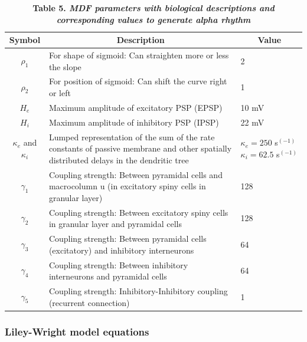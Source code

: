 \documentclass[12pt,twoside]{article}
\begin{document}
\begin{table}[H]
\begin{tabular}{|c|p{12cm}|p{2.5cm}| }
\hline
Symbol & \multicolumn{1}{|c|}{Description} & \multicolumn{1}{c|}{Value}  \\ 
 \hline
$\rho_{1}$ & For shape of sigmoid: Can straighten more or less the slope & 2 \\ 
 \hline
$\rho_{2}$ & For position of sigmoid: Can shift the curve right or left & 1 \\ 
 \hline
$H_{e}$ & Maximum amplitude of excitatory PSP (EPSP) & 10 mV \\%
 \hline
$H_{i}$ & Maximum amplitude of inhibitory PSP (IPSP) & 22 mV \\%
 \hline
$\kappa_{e}$ and $\kappa_{i}$ & Lumped representation of the sum of the rate constants of passive membrane and other spatially distributed delays in the dendritic tree & $\kappa_{e}= 250$ s$^{(-1)}$ \newline $\kappa_{i}= 62.5$ s$^{(-1)}$\\
 \hline
$\gamma_{1}$ & Coupling strength: Between pyramidal cells and macrocolumn u (in excitatory spiny cells in granular layer) & 128\\
\hline
$\gamma_{2}$ & Coupling strength: Between excitatory spiny cells in granular layer and pyramidal cells & 128\\
\hline
$\gamma_{3}$ & Coupling strength: Between pyramidal cells (excitatory) and inhibitory interneurons & 64\\
\hline
$\gamma_{4}$ & Coupling strength: Between inhibitory interneurons and pyramidal cells & 64\\
\hline
$\gamma_{5}$ & Coupling strength: Inhibitory-Inhibitory coupling (recurrent connection) & 1 \\%
\hline
\end{tabular}
\caption*{\textbf{Table 5.  \textit{MDF parameters with biological descriptions and corresponding values to generate alpha rhythm}}}
\label{tab:Moran}
\end{table}


\newpage
\subsubsection*{Liley-Wright model equations}
\end{document}
